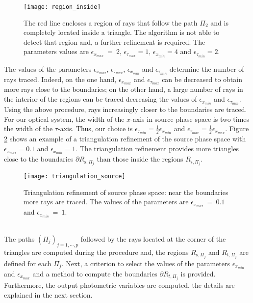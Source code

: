 \begin{figure}[h]
  \begin{center}
  \texttt{[image: region\_inside]}
  \end{center}
  \caption{The red line encloses a region of rays that follow the path $\Pi_2$ and is completely located inside a triangle.
  The algorithm is not able to detect that region and, a further refinement is required.
    The parameters values are $\epsilon_{x_{max}}~=~ 2$, $\epsilon_{\tau_{max}}= 1$, $\epsilon_{x_{min}}= 4$ and $\epsilon_{\tau_{min}}=2$. }
   \label{fig:region inside}
  \end{figure}
The values of the parameters $\epsilon_{x_{max}}$, $\epsilon_{\tau_{max}}$, $\epsilon_{x_{min}}$ and $\epsilon_{\tau_{min}}$ determine the number of rays traced.
Indeed, on the one hand, $\epsilon_{x_{max}}$ and $\epsilon_{\tau_{max}}$ can be decreased to obtain more rays close to the boundaries;
on the other hand, a large number of rays in the interior of the regions can be traced decreasing the values of $\epsilon_{x_{min}}$ and $\epsilon_{\tau_{min}}$. %
\newline
\indent Using the above procedure, rays increasingly closer to the boundaries are traced.
For our optical system, the width of the $x$-axis in source phase space is two times the width of the $\tau$-axis.
Thus, our choice is $\epsilon_{\tau_{min}}=\frac{1}{2}\epsilon_{x_{min}}$ and $\epsilon_{\tau_{max}} = \frac{1}{2}\epsilon_{x_{max}}$.
Figure \ref{fig:triangulation_refinement} shows an example of a triangulation refinement of the source phase space with $\epsilon_{x_{max}}=0.1$ and $\epsilon_{x_{min}}=1$.
The triangulation refinement provides more triangles close to the boundaries $\partial R_{\textrm{s}, \Pi_j}$ than those inside the regions $R_{\textrm{s}, \Pi_j}$.
\begin{figure}[h]
  \begin{center}
  \texttt{[image: triangulation\_source]}
  \end{center}
  \caption{Triangulation refinement of source phase space:
  near the boundaries more rays are traced.
    The values of the parameters are $\epsilon_{x_{max}}~=~ 0.1$ and $\epsilon_{x_{min}}~=~1$.}
   \label{fig:triangulation_refinement}
  \end{figure}
 \\ \indent The paths $(\Pi_j)_{j = 1, \cdots, p}$ followed by the rays located at the corner of the triangles are computed during the procedure and, the regions
 $R_{\textrm{s}, \Pi_j}$ and $R_{\textrm{t}, \Pi_j}$ are defined for each $\Pi_j$.
Next, a criterion to select the values of the parameters $\epsilon_{x_{min}}$ and $\epsilon_{x_{max}}$ and a method to compute the boundaries $\partial{R_{t, \Pi_j}}$ is provided.
Furthermore, the output photometric variables are computed, the details are explained in the next section.



